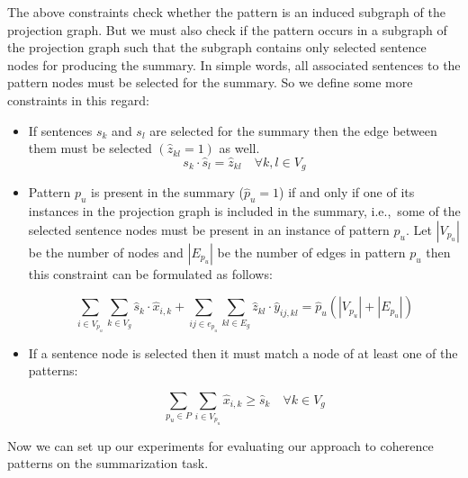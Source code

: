 The above constraints check whether the pattern is an induced subgraph of the projection graph. 
But we must also check if the pattern occurs in a subgraph of the projection graph such that the subgraph contains only selected sentence nodes for producing the summary. 
In simple words, all associated sentences to the pattern nodes must be selected for the summary. 
So we define some more constraints in this regard:

\begin{itemize}

\item If sentences $s_{k}$ and $s_{l}$ are selected for the summary then the edge between them must be selected $(\hat{z}_{kl}=1)$ as well.
\begin{equation}
	\label{eq:quadretic-const}
 s_{k} \cdot \hat{s}_{l}=\hat{z}_{kl} \quad \forall k,l \in V_{g}
\end{equation}

\item Pattern $p_u$ is present in the summary ($\hat{p}_u=1$) if and only if one of its instances in the projection graph is included in the summary, i.e.,\ some of the selected sentence nodes must be present in an instance of pattern $p_{u}$.
Let $|V_{p_{u}}|$ be the number of nodes and $|E_{p_u}|$ be the number of edges in pattern $p_{u}$ then this constraint can be formulated as follows:

\begin{equation}
\underset{i \in V_{p_u}}{\sum} \underset{k \in V_g}{\sum} \hat{s}_k \cdot \hat{x}_{i,k}+\underset{ij \in e_{p_u}}{\sum} \underset{kl \in E_g}{\sum} \hat{z}_{kl} \cdot \hat{y}_{ij,kl} = \hat{p}_{u}(|V_{p_u}|+|E_{p_u}|)
\end{equation}

\item If a sentence node is selected then it must match a node of at least one of the patterns:

\begin{equation}
\sum_{p_{u} \in P} \sum_{i \in V_{p_{u}}} \hat{x}_{i,k} \geq \hat{s}_{k} \quad \forall k \in V_{g}
 \end{equation}
\end{itemize}

Now we can set up our experiments for evaluating our approach to coherence patterns on the summarization task. 

